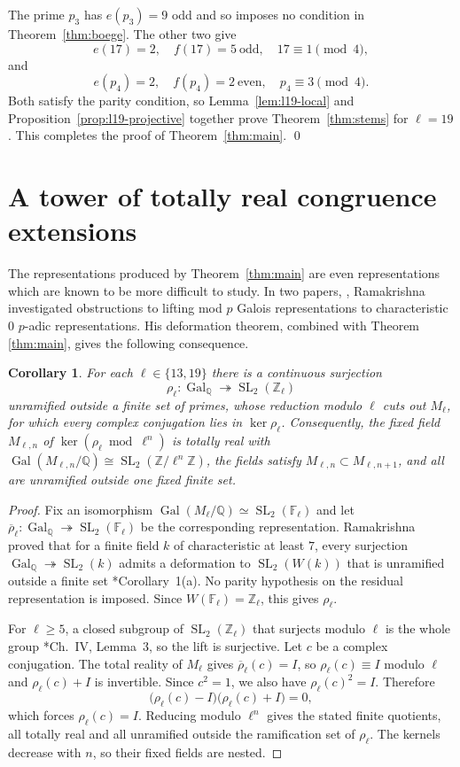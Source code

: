 \documentclass[10pt]{amsart}
\numberwithin{equation}{section}
\newcommand{\GQ}{\Gal_{\Q}}
\newtheorem{corollary}[theorem]{Corollary}
\theoremstyle{definition}
\theoremstyle{remark}
\newcommand{\F}{\mathbb{F}}
\newcommand{\Q}{\mathbb{Q}}
\newcommand{\Z}{\mathbb{Z}}
\newcommand{\SL}{\operatorname{SL}}
\newcommand{\Gal}{\operatorname{Gal}}
\begin{document}
The prime $p_3$ has $e(p_3)=9$ odd and so imposes no condition in
Theorem~\ref{thm:boege}.  The other two give
\[
 e(17)=2,\quad f(17)=5\ \text{odd},\quad 17\equiv1\pmod4,
\]
and
\[
 e(p_4)=2,\quad f(p_4)=2\ \text{even},\quad p_4\equiv3\pmod4 .
\]
Both satisfy the parity condition, so Lemma~\ref{lem:l19-local} and
Proposition~\ref{prop:l19-projective} together prove
Theorem~\ref{thm:stems} for $\ell=19$.  This completes the proof of
Theorem~\ref{thm:main}.
\qed

\section{A tower of totally real congruence
  extensions}\label{sec:consequence}

The representations produced by Theorem~\ref{thm:main} are even representations which are known to be more difficult to study. In two papers, \cites{Ramakrishna1999,Ramakrishna2002}, Ramakrishna investigated obstructions to lifting mod $p$ Galois representations to characteristic $0$ $p$-adic representations. His deformation theorem, combined with Theorem \ref{thm:main}, gives the following
consequence.

\begin{corollary}\label{cor:adic-towers}
For each $\ell\in\{13,19\}$ there is a continuous surjection
\[
 \rho_\ell\colon\GQ\twoheadrightarrow\SL_2(\Z_\ell)
\]
unramified outside a finite set of primes, whose reduction modulo $\ell$ cuts
out $M_\ell$, for which every complex conjugation lies in $\ker\rho_\ell$.
Consequently, the fixed field $M_{\ell,n}$ of
$\ker(\rho_\ell\bmod\ell^n)$ is totally real with
$\Gal(M_{\ell,n}/\Q)\cong\SL_2(\Z/\ell^n\Z)$, the fields satisfy
$M_{\ell,n}\subset M_{\ell,n+1}$, and all are unramified outside one fixed
finite set.
\end{corollary}

\begin{proof}
Fix an isomorphism $\Gal(M_\ell/\Q)\simeq\SL_2(\F_\ell)$ and let
$\overline\rho_\ell\colon\GQ\twoheadrightarrow\SL_2(\F_\ell)$ be the
corresponding representation.  Ramakrishna proved that for a finite field $k$
of characteristic at least $7$, every surjection
$\GQ\twoheadrightarrow\SL_2(k)$ admits a deformation to
$\SL_2(W(k))$ that is unramified outside a finite set
\cite{Ramakrishna2002}*{Corollary~1(a)}. No parity hypothesis on the residual
representation is imposed.  Since $W(\F_\ell)=\Z_\ell$, this gives
$\rho_\ell$.

For $\ell\geq5$, a closed subgroup of $\SL_2(\Z_\ell)$ that surjects
modulo $\ell$ is the whole group
\cite{Serre1968}*{Ch.~IV, Lemma~3}, so the lift is surjective. Let $c$ be a complex conjugation. The total reality of $M_\ell$ gives
$\overline\rho_\ell(c)=I$, so $\rho_\ell(c)\equiv I$ modulo $\ell$ and
$\rho_\ell(c)+I$ is invertible. Since $c^2=1$, we also have
$\rho_\ell(c)^2=I$. Therefore
\[
 \bigl(\rho_\ell(c)-I\bigr)\bigl(\rho_\ell(c)+I\bigr)=0 ,
\]
which forces $\rho_\ell(c)=I$.  Reducing modulo $\ell^n$ gives the stated
finite quotients, all totally real and all unramified outside the
ramification set of $\rho_\ell$.  The kernels decrease with $n$, so their
fixed fields are nested.
\end{proof}
\end{document}
